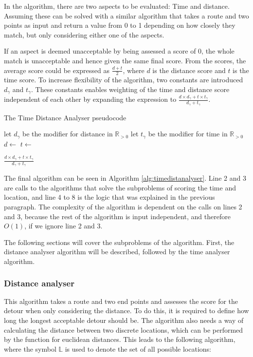 In the algorithm, there are two aspects to be evaluated: Time and distance.
Assuming these can be solved with a similar algorithm that takes a route and two points as input and return a value from 0 to 1 depending on how closely they match, but only considering either one of the aspects.

If an aspect is deemed unacceptable by being assessed a score of 0, the whole match is unacceptable and hence given the same final score.
From the scores, the average score could be expressed as $\frac{d+t}{2}$, where $d$ is the distance score and $t$ is the time score.
To increase flexibility of the algorithm, two constants are introduced $d_\gamma$ and $t_\gamma$.
These constants enables weighting of the time and distance score independent of each other by expanding the expression to $\frac{d\times d_\gamma+t\times t_\gamma}{d_\gamma+t_\gamma}$.

\begin{algorithm}
	\caption{The Time Distance Analyser pseudocode}
	\label{alg:timedistanalyser}
	\begin{algorithmic}[1]
		\Require 
		\Statex let $d_\gamma$ be the modifier for distance in $\mathbb{R}_{>0}$
		\Statex let $t_\gamma$ be the modifier for time in $\mathbb{R}_{>0}$
		\Statex 
			\State $d\gets$
			\State $t\gets$
			
				\State \Return $\frac{d\times d_\gamma+t\times t_\gamma}{d_\gamma+t_\gamma}$
			\Else
				\State{}
			\EndIf
		\EndFunction
	\end{algorithmic}
\end{algorithm}

The final algorithm can be seen in Algorithm \ref{alg:timedistanalyser}.
Line 2 and 3 are calls to the algorithms that solve the subproblems of scoring the time and location, and line 4 to 8 is the logic that was explained in the previous paragraph.
The complexity of the algorithm is dependent on the calls on lines 2 and 3, because the rest of the algorithm is input independent, and therefore $O(1)$, if we ignore line 2 and 3.

The following sections will cover the subproblems of the algorithm.
First, the distance analyser algorithm will be described, followed by the time analyser algorithm.

\subsubsection{Distance analyser}
This algorithm takes a route and two end points and assesses the score for the detour when only considering the distance.
To do this, it is required to define how long the longest acceptable detour should be.
The algorithm also needs a way of calculating the distance between two discrete locations, which can be performed by the function for euclidean distances.
This leads to the following algorithm, where the symbol $\mathbb{L}$ is used to denote the set of all possible locations:

